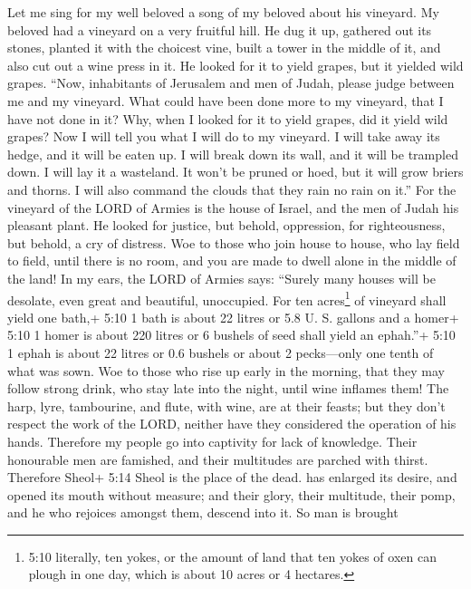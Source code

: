  Let me sing for my well beloved a song of my beloved about
his vineyard. My beloved had a vineyard on a very fruitful hill.
 He dug it up, gathered out its stones, planted it with the
choicest vine, built a tower in the middle of it, and also cut out a
wine press in it. He looked for it to yield grapes, but it yielded wild
grapes.  ``Now, inhabitants of Jerusalem and men of Judah,
please judge between me and my vineyard.  What could have
been done more to my vineyard, that I have not done in it? Why, when I
looked for it to yield grapes, did it yield wild grapes? 
Now I will tell you what I will do to my vineyard. I will take away its
hedge, and it will be eaten up. I will break down its wall, and it will
be trampled down.  I will lay it a wasteland. It won't be
pruned or hoed, but it will grow briers and thorns. I will also command
the clouds that they rain no rain on it.''  For the vineyard
of the LORD of Armies is the house of Israel, and the men of Judah his
pleasant plant. He looked for justice, but behold, oppression, for
righteousness, but behold, a cry of distress.  Woe to those
who join house to house, who lay field to field, until there is no room,
and you are made to dwell alone in the middle of the land! 
In my ears, the LORD of Armies says: ``Surely many houses will be
desolate, even great and beautiful, unoccupied.  For ten
acres\footnote{5:10 literally, ten yokes, or the amount of land that ten
  yokes of oxen can plough in one day, which is about 10 acres or 4
  hectares.} of vineyard shall yield one bath,+ 5:10 1 bath is about 22
litres or 5.8 U. S. gallons and a homer+ 5:10 1 homer is about 220
litres or 6 bushels of seed shall yield an ephah.''+ 5:10 1 ephah is
about 22 litres or 0.6 bushels or about 2 pecks---only one tenth of what
was sown.  Woe to those who rise up early in the morning,
that they may follow strong drink, who stay late into the night, until
wine inflames them!  The harp, lyre, tambourine, and flute,
with wine, are at their feasts; but they don't respect the work of the
LORD, neither have they considered the operation of his hands.
 Therefore my people go into captivity for lack of
knowledge. Their honourable men are famished, and their multitudes are
parched with thirst.  Therefore Sheol+ 5:14 Sheol is the
place of the dead. has enlarged its desire, and opened its mouth without
measure; and their glory, their multitude, their pomp, and he who
rejoices amongst them, descend into it.  So man is brought
